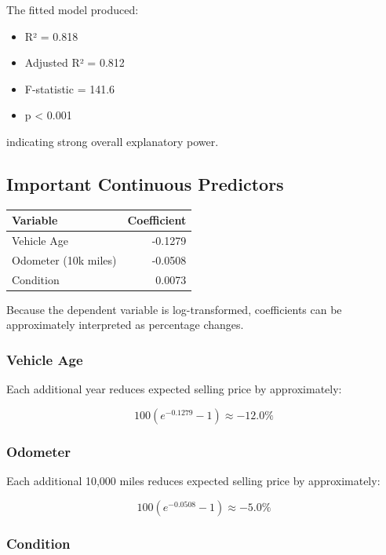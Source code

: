 \documentclass[
  12pt]{article}
\newcounter{none} %
\providecommand{\tightlist}{%
  \setlength{\itemsep}{0pt}\setlength{\parskip}{0pt}}
\begin{document}
The fitted model produced:

\begin{itemize}
\tightlist
\item
  R² = 0.818
\item
  Adjusted R² = 0.812
\item
  F-statistic = 141.6
\item
  p \textless{} 0.001
\end{itemize}

indicating strong overall explanatory power.

\subsection{Important Continuous
Predictors}\label{important-continuous-predictors}

{\def\LTcaptype{none} %
\begin{longtable}[]{@{}lr@{}}
\toprule\noalign{}
Variable & Coefficient \\
\midrule\noalign{}
\endhead
\bottomrule\noalign{}
\endlastfoot
Vehicle Age & -0.1279 \\
Odometer (10k miles) & -0.0508 \\
Condition & 0.0073 \\
\end{longtable}
}

Because the dependent variable is log-transformed, coefficients can be
approximately interpreted as percentage changes.

\subsubsection{Vehicle Age}\label{vehicle-age}

Each additional year reduces expected selling price by approximately:

\[
100(e^{-0.1279}-1) \approx -12.0\%
\]

\subsubsection{Odometer}\label{odometer}

Each additional 10,000 miles reduces expected selling price by
approximately:

\[
100(e^{-0.0508}-1) \approx -5.0\%
\]

\subsubsection{Condition}\label{condition}
\end{document}
